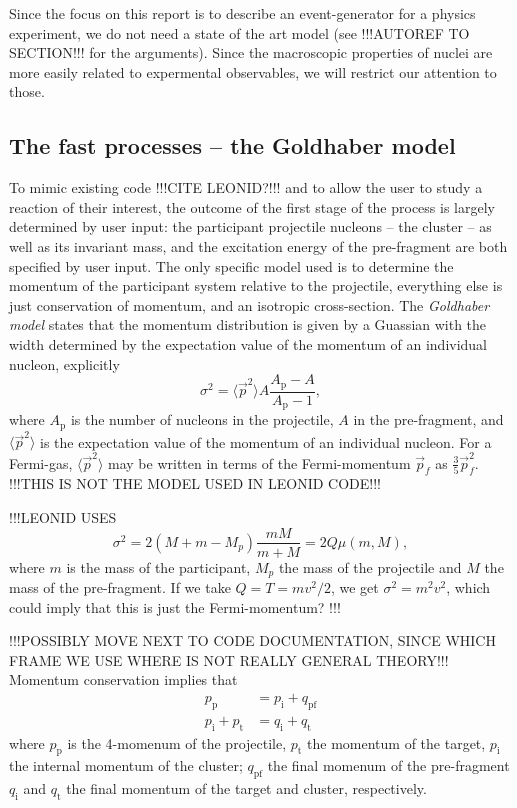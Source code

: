 Since the focus on this report is to describe an event-generator for a physics experiment, we do not need a state of the art model (see !!!AUTOREF TO SECTION!!! for the arguments). Since the macroscopic properties of nuclei are more easily related to expermental observables, we will restrict our attention to those. 

\subsection{The fast processes -- the Goldhaber model}
To mimic existing code !!!CITE LEONID?!!! and to allow the user to study a reaction of their interest, the outcome of the first stage of the process is largely determined by user input: the participant projectile nucleons -- the cluster -- as well as its invariant mass, and the excitation energy of the pre-fragment are both specified by user input. The only specific model used is to determine the momentum of the participant system relative to the projectile, everything else is just conservation of momentum, and an isotropic cross-section. 
The \emph{Goldhaber model} states that the momentum distribution is given by a Guassian with the width determined by the expectation value of the momentum of an individual nucleon, explicitly
\begin{equation}
\sigma^2 = \langle \vec{p}^2 \rangle A\frac{A_\text{p}-A}{A_\text{p}-1},
\end{equation}
where $A_\text{p}$ is the number of nucleons in the projectile, $A$ in the pre-fragment, and $\langle \vec{p}^2 \rangle$ is the expectation value of the momentum of an individual nucleon. For a Fermi-gas, $\langle \vec{p}^2 \rangle$ may be written in terms of the Fermi-momentum $\vec{p}_f$ as $\tfrac{3}{5} \vec{p}_f^2$\cite{goldhaber:1974:art}.
!!!THIS IS NOT THE MODEL USED IN LEONID CODE!!!


!!!LEONID USES
\begin{equation*}
\sigma^2 = 2 (M + m -M_p) \frac{mM}{m+M} = 2 Q \mu(m,M),
\end{equation*}
where $m$ is the mass of the participant, $M_p$ the mass of the projectile and $M$ the mass of the pre-fragment. If we take $Q=T = m v^2/2$, we get $\sigma^2 = m^2 v^2$, which could imply that this is just the Fermi-momentum?
!!!

!!!POSSIBLY MOVE NEXT TO CODE DOCUMENTATION, SINCE WHICH FRAME WE USE WHERE IS NOT REALLY GENERAL THEORY!!!
Momentum conservation implies that
\begin{align}
p_\text{p} &= p_\text{i} + q_\text{pf} \\
p_\text{i} + p_\text{t} &= q_\text{i} + q_\text{t}
\end{align}
where $p_\text{p}$ is the 4-momenum of the projectile, $p_\text{t}$ the momentum of the target, $p_\text{i}$ the internal momentum of the cluster; $q_\text{pf}$ the final momenum of the pre-fragment $q_\text{i}$ and $q_\text{t}$ the final momentum of the target and cluster, respectively.

